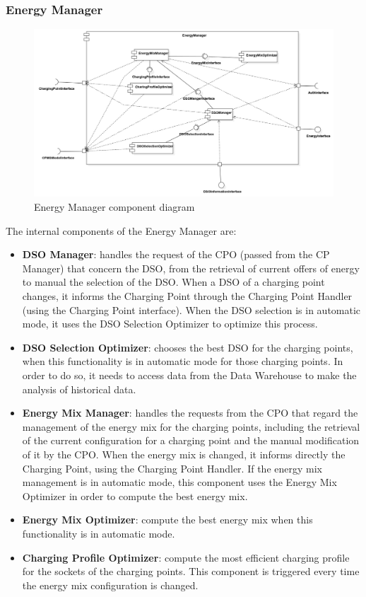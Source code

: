 \documentclass{Configuration_Files/PoliMi3i_thesis}
\begin{document}
\subsubsection{Energy Manager}

\begin{figure}[H]
    \centering
    \includegraphics[width=1\textwidth]{Images/component/EnergyManager.jpg}
    \caption{Energy Manager component diagram}
\end{figure}

The internal components of the Energy Manager are:
\begin{itemize}
    \item \textbf{DSO Manager}: handles the request of the CPO (passed from the CP Manager) that concern the DSO, from the retrieval of current offers of energy to manual the selection of the DSO. When a DSO of a charging point changes, it informs the Charging Point through the Charging Point Handler (using the Charging Point interface). When the DSO selection is in automatic mode, it uses the DSO Selection Optimizer to optimize this process.
    \item \textbf{DSO Selection Optimizer}: chooses the best DSO for the charging points, when this functionality is in automatic mode for those charging points. In order to do so, it needs to access data from the Data Warehouse to make the analysis of historical data.
    \item \textbf{Energy Mix Manager}: handles the requests from the CPO that regard the management of the energy mix for the charging points, including the retrieval of the current configuration for a charging point and the manual modification of it by the CPO. When the energy mix is changed, it informs directly the Charging Point, using the Charging Point Handler. If the energy mix management is in automatic mode, this component uses the Energy Mix Optimizer in order to compute the best energy mix.
    \item \textbf{Energy Mix Optimizer}: compute the best energy mix when this functionality is in automatic mode.
    \item \textbf{Charging Profile Optimizer}: compute the most efficient charging profile for the sockets of the charging points. This component is triggered every time the energy mix configuration is changed.
\end{itemize}
\end{document}
